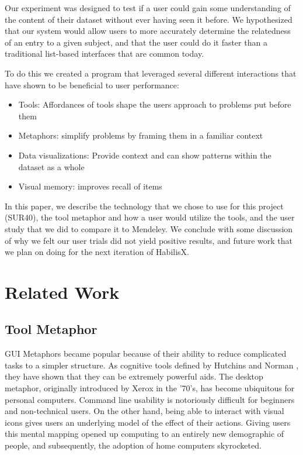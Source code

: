 \documentclass{article}
\begin{document}
Our experiment was designed to test if a user could gain some understanding of the content of their dataset without ever having seen it before.  We hypothesized that our system would allow users to more accurately determine the relatedness of an entry to a given subject, and that the user could do it faster than a traditional list-based interfaces that are common today.  

To do this we created a program that leveraged several different interactions that have shown to be beneficial to user performance:
\begin{itemize}
\item{Tools: Affordances of tools shape the users approach to problems put before them}
\item{Metaphors: simplify problems by framing them in a familiar context}
\item{Data visualizations: Provide context and can show patterns within the dataset as a whole}
\item{Visual memory: improves recall of items}
\end{itemize}

In this paper, we describe the technology that we chose to use for this project (SUR40), the tool metaphor and how a user would utilize the tools, and the user study that we did to compare it to Mendeley.  We conclude with some discussion of why we felt our user trials did not yield positive results, and future work that we plan on doing for the next iteration of HabilisX.


\section{Related Work} 
\subsection{Tool Metaphor}

GUI Metaphors became popular because of their ability to reduce complicated tasks to a simpler structure.  As cognitive tools defined by Hutchins \cite{Hutchins1995} and Norman \cite{Norman1991}, they have shown that they can be extremely powerful aids.  The desktop metaphor, originally introduced by Xerox in the '70's, has become ubiquitous for personal computers.  Command line usability is notoriously difficult for beginners and non-technical users.  On the other hand, being able to interact with visual icons gives users an underlying model of the effect of their actions.  Giving users this mental mapping opened up computing to an entirely new demographic of people, and subsequently, the adoption of home computers skyrocketed.  
\end{document}

